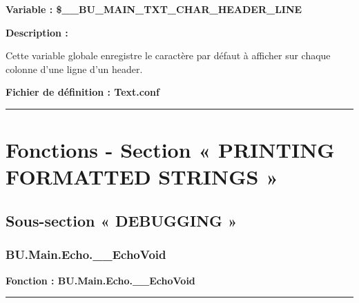 \documentclass[a4paper,10pt]{article}
\begin{document}

    \textbf{Variable : \color{vars}\$\_\_BU\_MAIN\_TXT\_CHAR\_HEADER\_LINE}\\[1\baselineskip]

    \setlength{\parskip}{2em}

    \begin{justify}
        \textbf{Description :}
    \end{justify}

    \setlength{\parskip}{1em}

    \begin{justify}
        Cette variable globale enregistre le caractère par défaut à afficher sur chaque colonne d'une ligne d'un header.
    \end{justify}

    \textbf{Fichier de définition : \color{path}Text.conf}\\[1\baselineskip]





    \color{sec1}\par\noindent\rule{\textwidth}{0.4pt}\color{text}

    \color{sec1}
    \section{Fonctions - Section « PRINTING FORMATTED STRINGS »}\color{text}

    \color{sec2}
    \subsection{Sous-section « DEBUGGING »}\color{text}

    \color{sec3}
    \subsubsection{BU.Main.Echo.\_\_EchoVoid}\color{text}

    \textbf{Fonction : \color{func}BU.Main.Echo.\_\_EchoVoid}\setlength{\parskip}{1em}


    \par\noindent\rule{\textwidth}{0.4pt}
\end{document}
